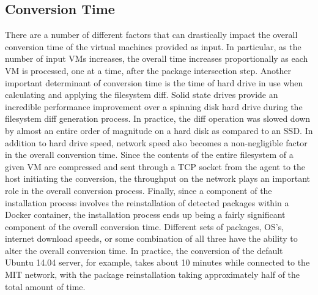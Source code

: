 \subsection{Conversion Time}
There are a number of different factors that can drastically impact the overall conversion time of the virtual machines provided as input. In particular, as the number of input VMs increases, the overall time increases proportionally as each VM is processed, one at a time, after the package intersection step. Another important determinant of conversion time is the time of hard drive in use when calculating and applying the filesystem diff. Solid state drives provide an incredible performance improvement over a spinning disk hard drive during the filesystem diff generation process. In practice, the diff operation was slowed down by almost an entire order of magnitude on a hard disk as compared to an SSD. In addition to hard drive speed, network speed also becomes a non-negligible factor in the overall conversion time. Since the contents of the entire filesystem of a given VM are compressed and sent through a TCP socket from the agent to the host initiating the conversion, the throughput on the network plays an important role in the overall conversion process. Finally, since a component of the installation process involves the reinstallation of detected packages within a Docker container, the installation process ends up being a fairly significant component of the overall conversion time. Different sets of packages, OS's, internet download speeds, or some combination of all three have the ability to alter the overall conversion time. In practice, the conversion of the default Ubuntu 14.04 server, for example, takes about 10 minutes while connected to the MIT network, with the package reinstallation taking approximately half of the total amount of time.




